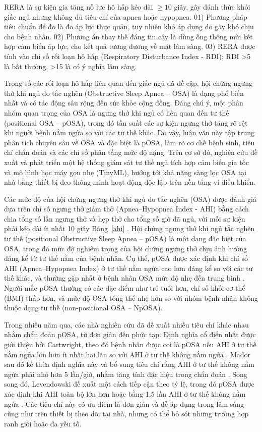 RERA là sự kiện gia tăng nỗ lực hô hấp kéo dài $\geq 10$ giây, 
gây đánh thức khỏi giấc ngủ nhưng không đủ tiêu chí của apnea hoặc hypopnea. 
01) Phương pháp tiêu chuẩn để đo là đo áp lực thực quản, tuy nhiên khó áp dụng do gây khó chịu cho bệnh nhân. 
02) Phương án thay thế đáng tin cậy là dùng ống thông mũi kết hợp cảm biến áp lực, 
cho kết quả tương đương về mặt lâm sàng. 
03) RERA được tính vào chỉ số rối loạn hô hấp (Respiratory Disturbance Index - RDI); 
RDI >5 là bất thường, >15 là có ý nghĩa lâm sàng.

Trong số các rối loạn hô hấp liên quan đến giấc ngủ đã đề cập, 
hội chứng ngưng thở khi ngủ do tắc nghẽn (Obstructive Sleep Apnea – OSA) 
là dạng phổ biến nhất và có tác động sâu rộng đến sức khỏe cộng đồng. 
Đáng chú ý, một phân nhóm quan trọng của OSA là ngưng thở khi ngủ 
có liên quan đến tư thế (positional OSA – pOSA), 
trong đó tần suất các sự kiện ngưng thở tăng rõ rệt khi người bệnh 
nằm ngửa so với các tư thế khác. 
Do vậy, luận văn này tập trung phân tích chuyên sâu về OSA và đặc biệt là pOSA, 
làm rõ cơ chế bệnh sinh, tiêu chí chẩn đoán và các chỉ số phân tầng mức độ nặng. 
Trên cơ sở đó, nghiên cứu đề xuất và phát triển một hệ thống giám sát tư thế ngủ tích hợp cảm biến gia tốc và 
mô hình học máy gọn nhẹ (TinyML), hướng tới khả năng sàng lọc OSA tại nhà bằng thiết bị đeo thông minh hoạt động độc lập trên nền tảng vi điều khiển.

Các mức độ của hội chứng ngưng thở khi ngủ do tắc nghẽn 
(OSA) được đánh giá dựa trên chỉ số ngưng thở giảm thở 
(Apnea–Hypopnea Index - AHI) bằng cách chia tổng số 
lần ngưng thở và hẹp thở cho tổng số giờ đã ngủ, 
với mỗi sự kiện phải kéo dài ít nhất 10 giây Bảng~\ref{ahi} \cite{osa_summary}. 
Hội chứng ngưng thở khi ngủ tắc nghẽn tư thế (positional Obstructive Sleep Apnea – pOSA) 
là một dạng đặc biệt của OSA, trong đó mức độ nghiêm trọng 
của hội chứng ngưng thở chịu ảnh hưởng đáng kể từ tư thế nằm của bệnh nhân. 
Cụ thể, pOSA được xác định khi chỉ số AHI (Apnea–Hypopnea Index) ở tư thế nằm ngửa cao hơn đáng kể so với các tư thế khác, 
và thường gặp nhất ở bệnh nhân OSA mức độ nhẹ đến trung bình \cite{heinzer2018,aloweidat2023positional}. 
Người mắc pOSA thường có các đặc điểm như trẻ tuổi hơn, chỉ số khối cơ thể (BMI) thấp hơn, và mức độ OSA tổng thể nhẹ hơn so với nhóm bệnh nhân không thuộc dạng tư thế (non-positional OSA – NpOSA).

Trong nhiều năm qua, các nhà nghiên cứu đã đề xuất nhiều tiêu chí 
khác nhau nhằm chẩn đoán pOSA, từ đơn giản đến phức tạp. 
Định nghĩa cổ điển nhất được giới thiệu bởi Cartwright, 
theo đó bệnh nhân được coi là pOSA nếu AHI ở tư thế nằm ngửa lớn 
hơn ít nhất hai lần so với AHI ở tư thế không nằm ngửa \cite{cartwright1984position}. 
Mador sau đó kế thừa định nghĩa này và bổ sung tiêu chí rằng 
AHI ở tư thế không nằm ngửa phải nhỏ hơn 5 lần/giờ, 
nhằm tăng tính đặc hiệu trong chẩn đoán \cite{mador2005prevalence}. 
Song song đó, Levendowski đề xuất một cách tiếp cận theo tỷ lệ, 
trong đó pOSA được xác định khi AHI toàn bộ lớn hơn hoặc bằng 1.5 lần 
AHI ở tư thế không nằm ngửa \cite{levendowski2015neck}. 
Các tiêu chí này có ưu điểm là đơn giản và dễ áp dụng trong lâm sàng 
cũng như trên thiết bị theo dõi tại nhà, 
nhưng có thể bỏ sót những trường hợp ranh giới hoặc đa yếu tố.

